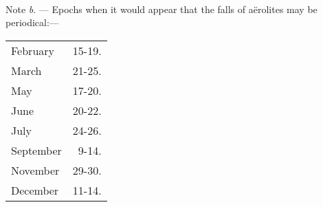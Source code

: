 \documentclass[a4paper, 12pt, oneside]{article}
\begin{document}
\paragraph{}
Note \emph{b}. --- Epochs when it would appear that the falls of aërolites may be periodical:---
\begin{table}[!ht]
    \centering
    \begin{tabular}{l r}
        February & 15-19. \\
        March & 21-25. \\
        May & 17-20. \\
        June & 20-22. \\
        July & 24-26. \\
        September & 9-14. \\
        November & 29-30. \\
        December & 11-14. \\
    \end{tabular}
\end{table}
\clearpage
\end{document}
